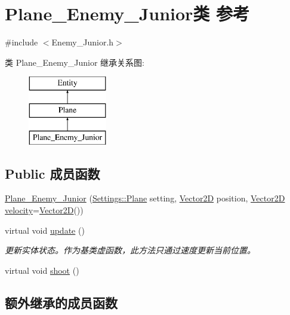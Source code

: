 \hypertarget{class_plane___enemy___junior}{}\section{Plane\+\_\+\+Enemy\+\_\+\+Junior类 参考}
\label{class_plane___enemy___junior}


{\ttfamily \#include $<$Enemy\+\_\+\+Junior.\+h$>$}

类 Plane\+\_\+\+Enemy\+\_\+\+Junior 继承关系图\+:\begin{figure}[H]
\begin{center}
\leavevmode
\includegraphics[height=3.000000cm]{class_plane___enemy___junior}
\end{center}
\end{figure}
\subsection*{Public 成员函数}
\begin{DoxyCompactItemize}
\item 
\hyperlink{class_plane___enemy___junior_a2a6b4a6903c05789e8be98d2d11a927d}{Plane\+\_\+\+Enemy\+\_\+\+Junior} (\hyperlink{struct_settings_1_1_plane}{Settings\+::\+Plane} setting, \hyperlink{_vector2_d_8hpp_aa1f1145650f1dd9bddf7335ec6434d7c}{Vector2D} position, \hyperlink{_vector2_d_8hpp_aa1f1145650f1dd9bddf7335ec6434d7c}{Vector2D} \hyperlink{class_entity_a386d25b56772b8913eb3e5adc636f6e0}{velocity}=\hyperlink{_vector2_d_8hpp_aa1f1145650f1dd9bddf7335ec6434d7c}{Vector2D}())
\item 
virtual void \hyperlink{class_plane___enemy___junior_a686e46c9927793dd07235cac72d52405}{update} ()
\begin{DoxyCompactList}\small\item\em 更新实体状态。作为基类虚函数，此方法只通过速度更新当前位置。 \end{DoxyCompactList}\item 
virtual void \hyperlink{class_plane___enemy___junior_ac9c3559aa4616f1b1efbe4a055fca0ac}{shoot} ()
\end{DoxyCompactItemize}
\subsection*{额外继承的成员函数}



